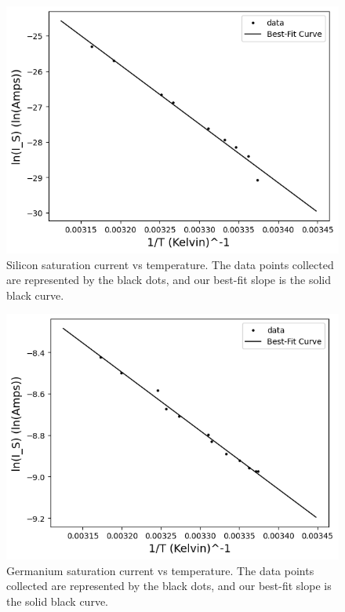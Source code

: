 \documentclass[12pt,letterpaper,twocolumn]{article}
\begin{document}
\begin{figure}[h]
	\includegraphics[width = .5\textwidth]{linSiSatCurrent.png}
	\caption{Silicon saturation current vs temperature. The data points collected are represented by the black dots, and our best-fit slope is the solid black curve.\label{g3}}
\end{figure}
\begin{figure}[h]
	\includegraphics[width = .5\textwidth]{linGeSatCurrent.png}
	\caption{Germanium saturation current vs temperature. The data points collected are represented by the black dots, and our best-fit slope is the solid black curve.\label{g4}}
\end{figure}

%
%
%
%
\end{document}
